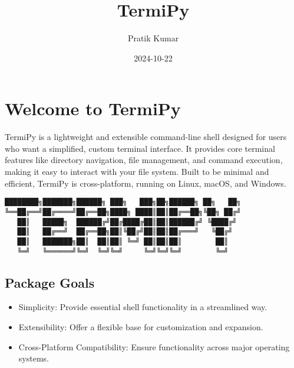 \documentclass[
  letterpaper,
  DIV=11,
  numbers=noendperiod]{scrreprt}
\title{TermiPy}
\author{Pratik Kumar}
\date{2024-10-22}
\providecommand{\tightlist}{%
  \setlength{\itemsep}{0pt}\setlength{\parskip}{0pt}}\usepackage{longtable,booktabs,array}
\renewcommand*\contentsname{Table of contents}
\newcommand\contentsname{Table of contents}
\begin{document}
\maketitle

\renewcommand*\contentsname{Table of contents}
{
\hypersetup{linkcolor=}
\setcounter{tocdepth}{2}
\tableofcontents
}


\chapter*{Welcome to TermiPy}\label{welcome-to-termipy}


TermiPy is a lightweight and extensible command-line shell designed for
users who want a simplified, custom terminal interface. It provides core
terminal features like directory navigation, file management, and
command execution, making it easy to interact with your file system.
Built to be minimal and efficient, TermiPy is cross-platform, running on
Linux, macOS, and Windows.

\href{https://badge.fury.io/py/termipy}{}
\href{https://opensource.org/licenses/MIT}{}
\href{https://pypi.org/project/termipy/}{}

\begin{verbatim}
████████╗███████╗██████╗ ███╗   ███╗██╗██████╗ ██╗   ██╗
╚══██╔══╝██╔════╝██╔══██╗████╗ ████║██║██╔══██╗╚██╗ ██╔╝
   ██║   █████╗  ██████╔╝██╔████╔██║██║██████╔╝ ╚████╔╝ 
   ██║   ██╔══╝  ██╔══██╗██║╚██╔╝██║██║██╔═══╝   ╚██╔╝  
   ██║   ███████╗██║  ██║██║ ╚═╝ ██║██║██║        ██║   
   ╚═╝   ╚══════╝╚═╝  ╚═╝╚═╝     ╚═╝╚═╝╚═╝        ╚═╝   
\end{verbatim}

\section*{Package Goals}\label{package-goals}


\begin{itemize}
\tightlist
\item
  Simplicity: Provide essential shell functionality in a streamlined
  way.
\item
  Extensibility: Offer a flexible base for customization and expansion.
\item
  Cross-Platform Compatibility: Ensure functionality across major
  operating systems.
\end{itemize}
\end{document}
